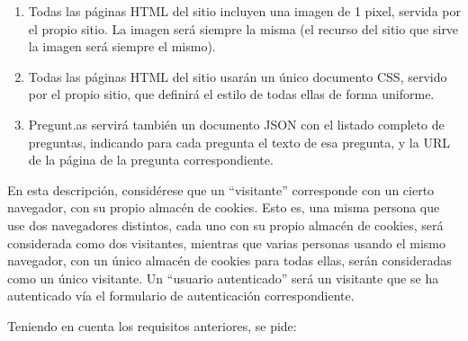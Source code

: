\begin{enumerate}
\item Todas las páginas HTML del sitio incluyen una imagen de 1 pixel, servida por el propio sitio. La imagen será siempre la misma (el recurso del sitio que sirve la imagen será siempre el mismo).

\item Todas las páginas HTML del sitio usarán un único documento CSS, servido por el propio sitio, que definirá el estilo de todas ellas de forma uniforme.

\item Pregunt.as servirá también un documento JSON con el listado completo de preguntas, indicando para cada pregunta el texto de esa pregunta, y la URL de la página de la pregunta correspondiente.
\end{enumerate}

En esta descripción, considérese que un ``visitante'' corresponde con un cierto navegador, con su propio almacén de cookies. Esto es, una misma persona que use dos navegadores distintos, cada uno con su propio almacén de cookies, será considerada como dos visitantes, mientras que varias personas usando el mismo navegador, con un único almacén de cookies para todas ellas, serán consideradas como un único visitante. Un ``usuario autenticado'' será un visitante que se ha autenticado vía el formulario de autenticación correspondiente.

Teniendo en cuenta los requisitos anteriores, se pide:

